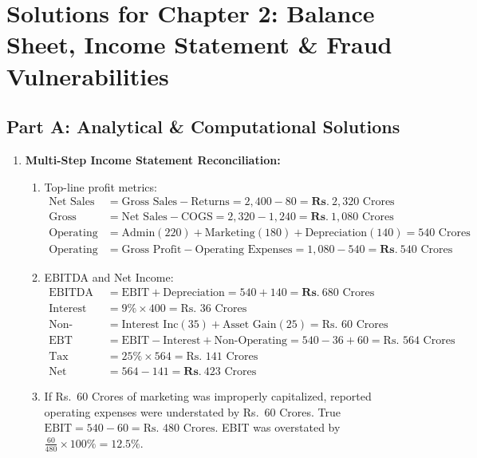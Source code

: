 \newpage
\section*{Solutions for Chapter 2: Balance Sheet, Income Statement \& Fraud Vulnerabilities}

\subsection*{Part A: Analytical \& Computational Solutions}

\begin{enumerate}[label=\textbf{P2.\arabic*}]
    \item \textbf{Multi-Step Income Statement Reconciliation:}
    \begin{enumerate}[label=(\alph*)]
        \item Top-line profit metrics:
        \begin{align*}
        \text{Net Sales Revenue} &= \text{Gross Sales} - \text{Returns} = 2{,}400 - 80 = \mathbf{Rs.~} 2{,}320\text{ Crores} \\
        \text{Gross Profit} &= \text{Net Sales} - \text{COGS} = 2{,}320 - 1{,}240 = \mathbf{Rs.~} 1{,}080\text{ Crores} \\
        \text{Operating Expenses} &= \text{Admin} (220) + \text{Marketing} (180) + \text{Depreciation} (140) = 540\text{ Crores} \\
        \text{Operating Profit (EBIT)} &= \text{Gross Profit} - \text{Operating Expenses} = 1{,}080 - 540 = \mathbf{Rs.~} 540\text{ Crores}
        \end{align*}
        \item EBITDA and Net Income:
        \begin{align*}
        \text{EBITDA} &= \text{EBIT} + \text{Depreciation} = 540 + 140 = \mathbf{Rs.~} 680\text{ Crores} \\
        \text{Interest Expense} &= 9\% \times 400 = \text{Rs.~} 36\text{ Crores} \\
        \text{Non-Operating Income} &= \text{Interest Inc} (35) + \text{Asset Gain} (25) = \text{Rs.~} 60\text{ Crores} \\
        \text{EBT} &= \text{EBIT} - \text{Interest} + \text{Non-Operating} = 540 - 36 + 60 = \text{Rs.~} 564\text{ Crores} \\
        \text{Tax Expense} &= 25\% \times 564 = \text{Rs.~} 141\text{ Crores} \\
        \text{Net Income} &= 564 - 141 = \mathbf{Rs.~} 423\text{ Crores}
        \end{align*}
        \item If Rs.~$60$ Crores of marketing was improperly capitalized, reported operating expenses were understated by Rs.~$60$ Crores. True $\text{EBIT} = 540 - 60 = \text{Rs.~} 480\text{ Crores}$. EBIT was overstated by $\frac{60}{480} \times 100\% = \mathbf{12.5\%}$.
    \end{enumerate}


\end{enumerate}
